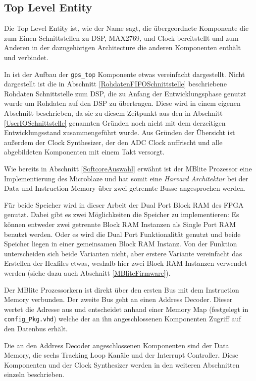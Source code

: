 \subsection{Top Level Entity}
Die Top Level Entity ist, wie der Name sagt, die übergeordnete Komponente die zum Einen Schnittstellen zu DSP, MAX2769, und Clock bereitstellt und zum Anderen in der dazugehörigen Architecture die anderen Komponenten enthält und verbindet.

In  ist der Aufbau der \lstinline$gps_top$ Komponente etwas vereinfacht dargestellt. Nicht dargestellt ist die in Abschnitt \ref{RohdatenFIFOSchnittstelle} beschriebene Rohdaten Schnittstelle zum DSP, die zu Anfang der Entwicklungsphase genutzt wurde um Rohdaten auf den DSP zu übertragen. Diese wird in einem eigenen Abschnitt beschrieben, da sie zu diesem Zeitpunkt aus den in Abschnitt \ref{UserIOSchnittstelle} genannten Gründen noch nicht mit dem derzeitigen Entwicklungsstand zusammengeführt wurde. Aus Gründen der Übersicht ist außerdem der Clock Synthesizer, der den ADC Clock auffrischt und alle abgebildeten Komponenten mit einem Takt versorgt.


Wie bereits in Abschnitt \ref{SoftcoreAuswahl} erwähnt ist der  MBlite Prozessor eine Implementierung des Microblaze und hat somit eine \emph{Harvard Architektur} bei der Data und Instruction Memory über zwei getrennte Busse angesprochen werden.

Für beide Speicher wird in dieser Arbeit der Dual Port Block RAM des FPGA genutzt. Dabei gibt es zwei Möglichkeiten die Speicher zu implementieren: Es können entweder zwei getrennte Block RAM Instanzen als Single Port RAM benutzt werden. Oder es wird die Dual Port Funktionalität genutzt und beide Speicher liegen in  einer gemeinsamen Block RAM Instanz. Von der Funktion unterscheiden sich beide Varianten nicht, aber erstere Variante vereinfacht das Erstellen der Hexfiles etwas, weshalb hier zwei Block RAM Instanzen verwendet werden (siehe dazu auch Abschnitt \ref{MBliteFirmware}).

Der MBlite Prozessorkern ist direkt über den ersten Bus mit dem Instruction Memory verbunden. Der zweite Bus geht an einen Address Decoder. Dieser wertet die Adresse aus und entscheidet anhand einer Memory Map (festgelegt in \lstinline$config_Pkg.vhd$) welche der an ihn angeschlossenen Komponenten Zugriff auf den Datenbus erhält.

Die an den Address Decoder angeschlossenen Komponenten sind der Data Memory, die sechs Tracking Loop Kanäle und der Interrupt Controller. Diese Komponenten und der Clock Synthesizer werden in den weiteren Abschnitten einzeln beschrieben.